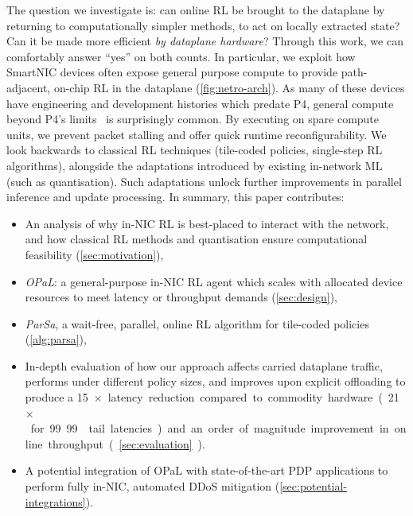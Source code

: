 \documentclass[sigconf,natbib=false]{acmart}
\newcommand{\approachshort}{OPaL}
\begin{document}
The question we investigate is: can online RL be brought to the dataplane by returning to computationally simpler methods, to act on locally extracted state?
Can it be made more efficient \emph{by dataplane hardware}?
Through this work, we can comfortably answer ``yes'' on both counts.
In particular, we exploit how SmartNIC devices often expose general purpose compute to provide path-adjacent, on-chip RL in the dataplane (\cref{fig:netro-arch}).
As many of these devices have engineering and development histories which predate P4, general compute beyond P4's limits~\parencite{p4-psa} is surprisingly common.
By executing on spare compute units, we prevent packet stalling and offer quick runtime reconfigurability.
We look backwards to classical RL techniques (tile-coded policies, single-step RL algorithms), alongside the adaptations introduced by existing in-network ML (such as quantisation).
Such adaptations unlock further improvements in parallel inference and update processing.
In summary, this paper contributes:
\begin{itemize}
	\item An analysis of why in-NIC RL is best-placed to interact with the network, and how classical RL methods and quantisation ensure computational feasibility (\cref{sec:motivation}),
	\item \emph{\approachshort{}}: a general-purpose in-NIC RL agent which scales with allocated device resources to meet latency or throughput demands (\cref{sec:design}),
	\item \emph{ParSa}, a wait-free, parallel, online RL algorithm for tile-coded policies (\cref{alg:parsa}),
	\item In-depth evaluation of how our approach affects carried dataplane traffic, performs under different policy sizes, and improves upon explicit offloading to produce a \SI{15}{$\times$} latency reduction compared to commodity hardware (\SI{21}{$\times$} for 99.99 tail latencies) and an order of magnitude improvement in online throughput (\cref{sec:evaluation}).
	\item A potential integration of \approachshort{} with state-of-the-art PDP applications to perform fully in-NIC, automated DDoS mitigation (\cref{sec:potential-integrations}).
\end{itemize}
\end{document}
